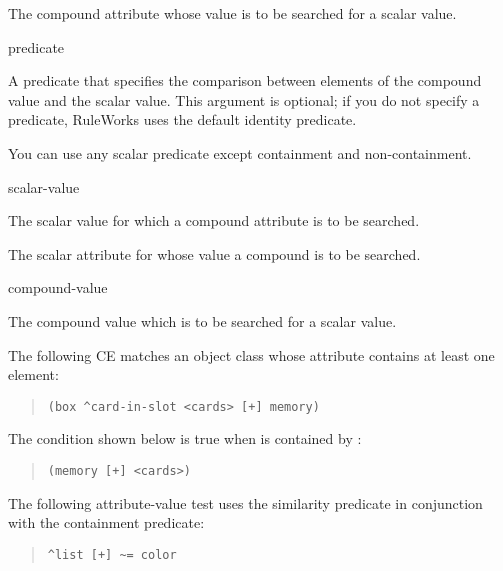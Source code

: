 \begin{operands}
\item[\ct{compound-attr}]

  The compound attribute whose value is to be searched for a scalar
  value.

\item[predicate]

  A predicate that specifies the comparison between elements of the
  compound value and the scalar value. This argument is optional; if
  you do not specify a predicate, RuleWorks uses the default identity
  predicate.

  You can use any scalar predicate except containment and
  non-containment.

\item[scalar-value]

  The scalar value for which a compound attribute is to be searched.

\item[\ct{scalar-attr}]

  The scalar attribute for whose value a compound is to be searched.

\item[compound-value]

  The compound value which is to be searched for a scalar value.
\end{operands}

\Example

The following CE matches an object class  whose
\ct{} attribute contains at least one  element:

\begin{quote}
\begin{verbatim}
(box ^card-in-slot <cards> [+] memory)
\end{verbatim}
\end{quote}

The condition shown below is true when  is contained by
:

\begin{quote}
\begin{verbatim}
(memory [+] <cards>)
\end{verbatim}
\end{quote}

The following attribute-value test uses the similarity
predicate in conjunction with the containment predicate:

\begin{quote}
\begin{verbatim}
^list [+] ~= color
\end{verbatim}
\end{quote}

